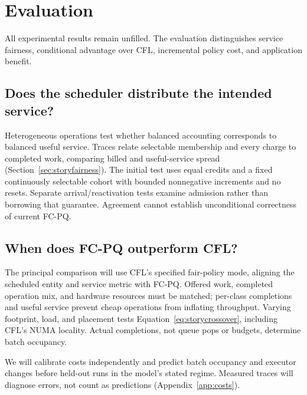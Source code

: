\section{Evaluation}
\label{sec:storyevaluation}
All experimental results remain unfilled. The evaluation distinguishes service
fairness, conditional advantage over CFL, incremental policy cost, and
application benefit.


\subsection{Does the scheduler distribute the intended service?}
Heterogeneous operations test whether balanced accounting corresponds to
balanced useful service. Traces relate selectable membership and every
charge to completed work, comparing billed and useful-service spread
(Section~\ref{sec:storyfairness}). The initial test
uses equal credits and a fixed continuously selectable cohort with bounded
nonnegative increments and no resets. Separate arrival/reactivation tests
examine admission rather than borrowing that guarantee. Agreement cannot
establish unconditional correctness of current FC-PQ.


\subsection{When does FC-PQ outperform CFL?}
The principal comparison will use CFL's specified fair-policy mode, aligning
the scheduled entity and service metric with FC-PQ. Offered work, completed
operation mix, and hardware resources must be matched; per-class completions
and useful service prevent cheap operations from inflating throughput.
Varying footprint, load, and placement tests
Equation~\eqref{eq:storycrossover}, including CFL's NUMA locality.
Actual completions, not queue pops or budgets, determine batch occupancy.

We will calibrate costs independently and predict batch occupancy and executor
changes before held-out runs in the model's stated regime. Measured traces
will diagnose errors, not count as predictions (Appendix~\ref{app:costs}).

